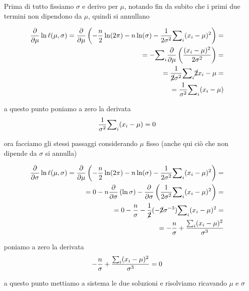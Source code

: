 \begin{esempio}
\noindent Prima di tutto fissiamo $\sigma$ e derivo per $\mu$, notando fin da subito che i primi due termini non dipendono da $\mu$, quindi si annullano

\begin{align*}
    \frac{\partial}{\partial \mu} \ln \ell(\mu, \sigma) = \frac{\partial}{\partial \mu} \left(-\frac{n}{2} \ln(2\pi) - n\ln(\sigma) - \frac{1}{2\sigma^2} {\sum}_i (x_i - \mu)^2 \right) = \\
    = - {\sum}_i \frac{\partial}{\partial \mu} \left( \frac{(x_i - \mu)^2}{2\sigma^2} \right) = \\ = \frac{1}{\cancel{2}\sigma^2}{\sum}_i \cancel{2}x_i - \mu = \\
    = \frac{1}{\sigma^2} {\sum}_i (x_i - \mu)
\end{align*}

\noindent a questo punto poniamo a zero la derivata
$$\frac{1}{\sigma^2} {\sum}_i (x_i - \mu) = 0$$

\noindent ora facciamo gli stessi passaggi considerando $\mu$ fisso (anche qui ciò che non dipende da $\sigma$ si annulla)

\begin{align*}
    \frac{\partial}{\partial \sigma} \ln \ell(\mu, \sigma) = \frac{\partial}{\partial \mu} \left(-\frac{n}{2} \ln(2\pi) - n\ln(\sigma) - \frac{1}{2\sigma^2} {\sum}_i (x_i - \mu)^2 \right) = \\ = 0 - n\frac{\partial}{\partial \sigma} \left( \ln{\sigma} \right) - \frac{\partial}{\partial \sigma} \left(\frac{1}{2\sigma^2} {\sum}_i (x_i - \mu)^2 \right) = \\
    = 0 -\frac{n}{\sigma} - \frac{1}{\cancel{2}}(-\cancel{2}\sigma^{-3}){\sum}_i (x_i - \mu)^2 = \\
    = -\frac{n}{\sigma} + \frac{{\sum}_i(x_i - \mu)^2}{\sigma^3}
\end{align*}

\noindent poniamo a zero la derivata
$$-\frac{n}{\sigma} + \frac{{\sum}_i(x_i - \mu)^2}{\sigma^3} = 0$$

\noindent a questo punto mettiamo a sistema le due soluzioni e risolviamo ricavando $\mu$ e $\sigma$


\end{esempio}
